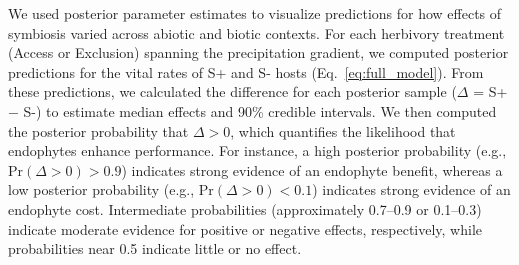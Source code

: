 \documentclass[12pt]{article}\usepackage[]{graphicx}\usepackage[dvipsnames]{xcolor}
\newcommand{\tom}[2]{{\color{red}{#1}}\footnote{\textit{\color{red}{#2}}}}
\begin{document}
We used posterior parameter estimates to visualize predictions for how effects of symbiosis varied across abiotic and biotic contexts. 
For each herbivory treatment (Access or Exclusion) spanning the precipitation gradient, we computed posterior predictions for the vital rates of S+ and S- hosts (Eq.~\ref{eq:full_model}).  
From these predictions, we calculated the difference for each posterior sample ($\Delta$ = S+ $-$ S-) to estimate median effects and 90\% credible intervals.  
We then computed the posterior probability that $\Delta > 0$, which quantifies the likelihood that endophytes enhance performance. 
For instance, a high posterior probability (e.g., Pr$(\Delta>0) >0.9$) indicates strong evidence of an endophyte benefit, whereas a low posterior probability (e.g., Pr$(\Delta>0) <0.1$) indicates strong evidence of an endophyte cost. 
Intermediate probabilities (approximately 0.7–0.9 or 0.1–0.3) indicate moderate evidence for positive or negative effects, respectively, while probabilities near 0.5 indicate little or no effect.
\end{document}
